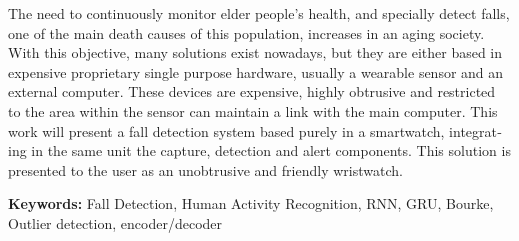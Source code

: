 \begin{otherlanguage}{english}
The need to continuously monitor elder people's health, and specially detect falls, one of the main death causes of this population, increases in an aging society. With this objective, many solutions exist nowadays, but they are either based in expensive proprietary single purpose hardware, usually a wearable sensor and an external computer. These devices are expensive, highly obtrusive and restricted to the area within the sensor can maintain a link with the main computer. This work will present a fall detection system based purely in a smartwatch, integrating in the same unit the capture, detection and alert components. This solution is presented to the user as an unobtrusive and friendly wristwatch.

{\bf Keywords:} Fall Detection, Human Activity Recognition, RNN, GRU, Bourke, Outlier detection, encoder/decoder
\end{otherlanguage}
